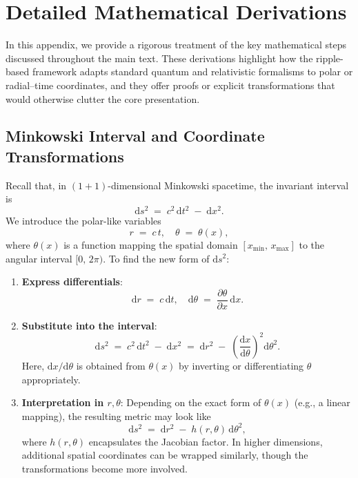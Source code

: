 \documentclass{article}
\begin{document}




\appendix
\section{Detailed Mathematical Derivations}
\label{app:derivations}

In this appendix, we provide a rigorous treatment of the key mathematical steps 
discussed throughout the main text. These derivations highlight how the 
ripple-based framework adapts standard quantum and relativistic formalisms 
to polar or radial--time coordinates, and they offer proofs or explicit 
transformations that would otherwise clutter the core presentation.

\subsection{Minkowski Interval and Coordinate Transformations}
\label{app:sec:minkowski-coord}
Recall that, in \((1+1)\)-dimensional Minkowski spacetime, the invariant interval is 
\[
  \mathrm{d}s^2 \;=\; c^2\,\mathrm{d}t^2 \;-\; \mathrm{d}x^2.
\]
We introduce the polar-like variables
\[
  r \;=\; c \, t, \quad \theta \;=\; \theta(x),
\]
where $\theta(x)$ is a function mapping the spatial domain \([x_{\min},\,x_{\max}]\) 
to the angular interval $[0,\,2\pi)$. To find the new form of $\mathrm{d}s^2$:

\begin{enumerate}
  \item \textbf{Express differentials}: 
    \[
      \mathrm{d}r \;=\; c\, \mathrm{d}t, 
      \quad
      \mathrm{d}\theta \;=\; \frac{\partial \theta}{\partial x}\,\mathrm{d}x.
    \]

  \item \textbf{Substitute into the interval}: 
    \[
      \mathrm{d}s^2 \;=\; c^2\,\mathrm{d}t^2 \;-\;\mathrm{d}x^2 
      \;=\; \mathrm{d}r^2 \;-\;\left(\frac{\mathrm{d}x}{\mathrm{d}\theta}\right)^2 
      \!\!\mathrm{d}\theta^2.
    \]
    Here, $\mathrm{d}x / \mathrm{d}\theta$ is obtained from $\theta(x)$ 
    by inverting or differentiating $\theta$ appropriately.

  \item \textbf{Interpretation in \(r, \theta\)}: 
    Depending on the exact form of $\theta(x)$ (e.g., a linear mapping), 
    the resulting metric may look like
    \[
      \mathrm{d}s^2 
      \;=\; \mathrm{d}r^2 
           \;-\; h(r,\theta)\,\mathrm{d}\theta^2,
    \]
    where $h(r,\theta)$ encapsulates the Jacobian factor. 
    In higher dimensions, additional spatial coordinates can be wrapped 
    similarly, though the transformations become more involved.
\end{enumerate}
\end{document}
